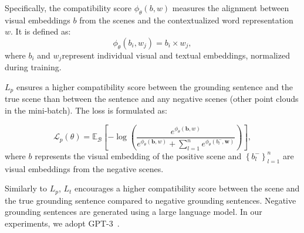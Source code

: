 \documentclass[lettersize,journal]{IEEEtran}
\begin{document}
Specifically, the compatibility score $\phi _{\theta } \left ( b,w \right )$ measures the alignment between visual embeddings \(b\) from the scenes and the contextualized word representation \( w \). It is defined as:
\begin{equation}
\phi _{\theta } \left ( b_{i} ,w_{j}  \right ) = b_{i}\times w_{j},
\end{equation}
where  \( b_i \) and  \( w_j \)represent individual visual and textual embeddings, normalized during training.

$L_{p}$ ensures a higher compatibility score between the grounding sentence and the true scene than between the sentence and any negative scenes (other point clouds in the mini-batch). The loss is formulated as:

\begin{equation}
\mathcal{L}_{p}(\theta)=
\mathbb{E}_{\mathcal{B}}\left[-\log \left(
\frac{e^{\phi_{\theta}(\mathbf{b}, w)}}
{e^{\phi_{\theta}(\mathbf{b}, w)}+\sum_{l=1}^{n} e^{\phi_{\theta}\left(b^{-}_{l}, \mathbf{w}\right)}}
\right)\right],
\label{ai:lvis}
\end{equation}
where \( b \) represents the visual embedding of the positive scene and $\left \{ b_{l}^{-}   \right \} _{l=1}^{n}$ are visual embeddings from the negative scenes. 

Similarly to $L_{p}$, $L_{t}$ encourages a higher compatibility score 
between the scene and the true grounding sentence compared to negative grounding sentences.
Negative grounding sentences are generated using a large language model. In our experiments, we adopt GPT-3~\cite{gpt}.

\end{document}

